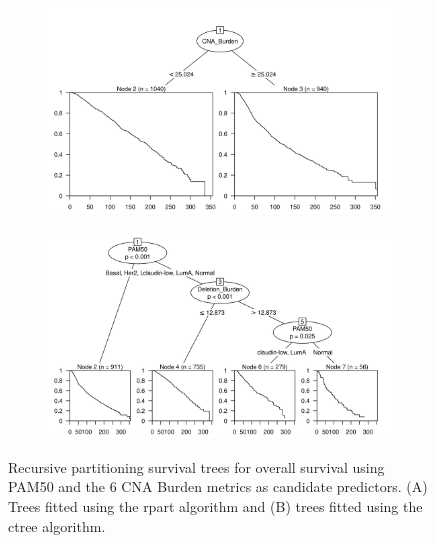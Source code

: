 \begin{figure}[!htb]
\centering

\vspace{0.5cm}

\begin{subfigure}{\textwidth}
\subcaption{}
\includegraphics[width=1\textwidth]{../figures/Appendices/Appendix_B/PartyKit_Survival_Burden_OS_PAM50.png}
\end{subfigure}

\vspace{2cm}

\begin{subfigure}{\textwidth}
\subcaption{}
\includegraphics[width=1\textwidth]{../figures/Appendices/Appendix_B/Ctree_Survival_Burden_OS_PAM50.png}
\end{subfigure}

\vspace{0.5cm}

\caption[Recursive partitioning survival trees for overall survival using PAM50 and the 6 CNA Burden metrics as candidate predictors.]{Recursive partitioning survival trees for overall survival using PAM50 and the 6 CNA Burden metrics as candidate predictors. (A) Trees fitted using the rpart algorithm and (B) trees fitted using the ctree algorithm.}
\end{figure}

